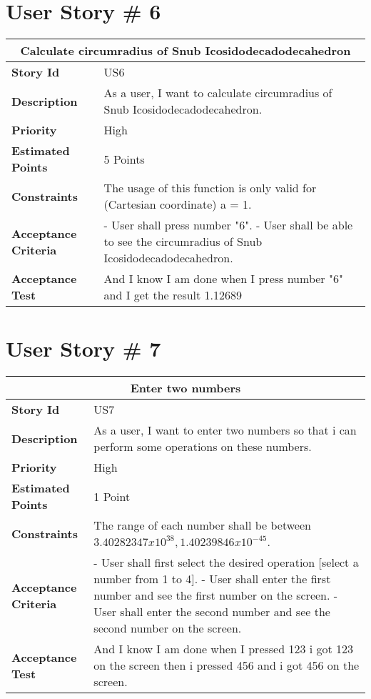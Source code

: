 \documentclass{report}
\begin{document}
\section{User Story \# 6}
\begin{tabular}{|p{3.5cm}|p{9cm}| }
\hline
\multicolumn{2}{|c|}{Calculate circumradius of Snub Icosidodecadodecahedron\cite{pn}} \\
\hline
\textbf {Story Id}& US6\\
\hline
\textbf{Description}& As a user, I want to calculate circumradius of Snub Icosidodecadodecahedron.\\
\hline
\textbf{Priority} & High\\
\hline
\textbf{Estimated Points} & 5 Points \\
\hline
\textbf{Constraints}& The usage of this function is only valid for (Cartesian coordinate) a = 1.\\
\hline
\textbf{Acceptance Criteria}& 
-   User shall press number "6".\newline
-   User shall be able to see the circumradius of Snub Icosidodecadodecahedron.\\
\hline
\textbf{Acceptance Test}& And I know I am done when I press number "6" and I get the result 1.12689 \\
\hline
\end{tabular}

\section{User Story \# 7}
\begin{tabular}{|p{3.5cm}|p{9cm}| }
\hline
\multicolumn{2}{|c|}{Enter two numbers} \\
\hline
\textbf {Story Id}& US7\\
\hline
\textbf{Description}& As a user, I want to enter two numbers so that i can perform some operations on these numbers.\\
\hline
\textbf{Priority} & High \\
\hline
\textbf{Estimated Points} & 1 Point \\
\hline
\textbf{Constraints}& The range of each number shall be between $3.40282347x10^{38} , 1.40239846 x 10^{-45}$.\\
\hline
\textbf{Acceptance Criteria}&
-   User shall first select the desired operation [select a number from 1 to 4].\newline
-   User shall enter the first number and see the first number on the screen.\newline
-   User shall enter the second number and see the second number on the screen.\\
\hline
\textbf{Acceptance Test}& And I know I am done when I pressed 123 i got 123 on the screen then i pressed 456 and i got 456 on the screen.\\
\hline
\end{tabular}
\end{document}
